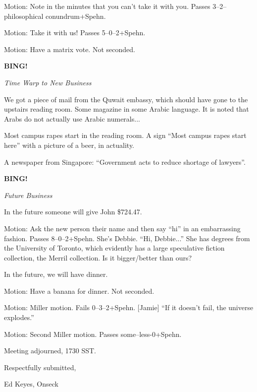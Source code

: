 \documentclass[12pt]{article}
\newcommand{\bing}{{\bf BING!} }
\newcommand{\goto}[1]{\bing \vskip 12pt \centerline{{\em{#1}}}}
\begin{document}
Motion: Note in the minutes that you can't take it with you.
Passes 3--2--philosophical conundrum+Spehn.

Motion: Take it with us!  Passes 5--0--2+Spehn.

Motion: Have a matrix vote.  Not seconded.

\goto{Time Warp to New Business}

We got a piece of mail from the Quwait embassy, which should have
gone to the upstairs reading room.  Some magazine in some Arabic
language.  It is noted that Arabs do not actually use Arabic
numerals...

Most campus rapes start in the reading room.  A sign ``Most campus
rapes start here'' with a picture of a beer, in actuality.

A newspaper from Singapore: ``Government acts to reduce shortage
of lawyers''.

\goto{Future Business}

In the future someone will give John \$724.47.

Motion: Ask the new person their name and then say ``hi'' in an
embarrassing fashion.  Passes 8--0--2+Spehn.  She's Debbie.
``Hi, Debbie...''  She has degrees from the University of Toronto,
which evidently has a large speculative fiction collection, the
Merril collection.  Is it bigger/better than ours?

In the future, we will have dinner.

Motion: Have a banana for dinner.  Not seconded.

Motion: Miller motion.  Fails 0--3--2+Spehn.  [Jamie] ``If it doesn't
fail, the universe explodes.''

Motion: Second Miller motion.  Passes some--less-0+Spehn.

\vspace{12pt}

\noindent
Meeting adjourned, 1730 SST.

\vspace{18pt}

\centerline{Respectfully submitted,}
\centerline{Ed Keyes, Onseck}
\end{document}
